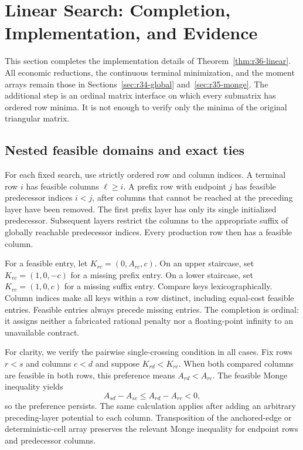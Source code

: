 \section{Linear Search: Completion, Implementation, and Evidence}\label{ec:r36-linear}
This section completes the implementation details of Theorem~\ref{thm:r36-linear}. All economic reductions, the continuous terminal minimization, and the moment arrays remain those in Sections~\ref{sec:r34-global} and~\ref{sec:r35-monge}. The additional step is an ordinal matrix interface on which every submatrix has ordered row minima. It is not enough to verify only the minima of the original triangular matrix.

\subsection{Nested feasible domains and exact ties}
For each fixed search, use strictly ordered row and column indices. A terminal row $i$ has feasible columns $\ell\geq i$. A prefix row with endpoint $j$ has feasible predecessor indices $i<j$, after columns that cannot be reached at the preceding layer have been removed. The first prefix layer has only its single initialized predecessor. Subsequent layers restrict the columns to the appropriate suffix of globally reachable predecessor indices. Every production row then has a feasible column.

For a feasible entry, let $K_{rc}=(0,A_{rc},c)$. On an upper staircase, set $K_{rc}=(1,0,-c)$ for a missing prefix entry. On a lower staircase, set $K_{rc}=(1,0,c)$ for a missing suffix entry. Compare keys lexicographically. Column indices make all keys within a row distinct, including equal-cost feasible entries. Feasible entries always precede missing entries. The completion is ordinal: it assigns neither a fabricated rational penalty nor a floating-point infinity to an unavailable contract.

For clarity, we verify the pairwise single-crossing condition in all cases. Fix rows $r<s$ and columns $c<d$ and suppose $K_{rd}<K_{rc}$. When both compared columns are feasible in both rows, this preference means $A_{rd}<A_{rc}$. The feasible Monge inequality yields
\[
 A_{sd}-A_{sc}\leq A_{rd}-A_{rc}<0,
\]
so the preference persists. The same calculation applies after adding an arbitrary preceding-layer potential to each column. Transposition of the anchored-edge or deterministic-cell array preserves the relevant Monge inequality for endpoint rows and predecessor columns.

